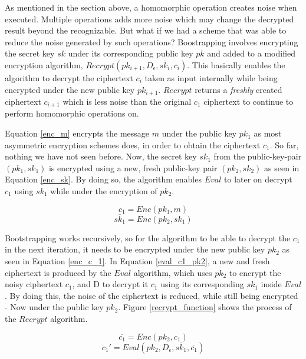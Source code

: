 As mentioned in the section above, a homomorphic operation creates noise when executed. Multiple operations adds more noise which may change the decrypted result beyond the recognizable. But what if we had a scheme that was able to reduce the noise generated by such operations? Boostrapping involves encrypting the secret key $sk$ under its corresponding public key $pk$ and added to a modified encryption algorithm, $Recrypt(pk_{i+1}, D_{\epsilon}, \overline{sk_i}, c_i)$. This basically enables the algorithm to decrypt the ciphertext $c_i$ taken as input internally while being encrypted under the new public key $pk_{i+1}$. $Recrypt$ returns a \emph{freshly} created ciphertext $c_{i+1}$ which is less noise than the original $c_1$ ciphertext to continue to perform homomorphic operations on.

Equation \ref{enc_m} encrypts the message $m$ under the public key $pk_1$ as most asymmetric encryption schemes does, in order to obtain the ciphertext $c_1$. So far, nothing we have not seen before. Now, the secret key $sk_1$ from the public-key-pair $(pk_1,sk_1)$ is encrypted using a new, fresh public-key pair $(pk_2, sk_2)$ as seen in Equation \ref{enc_sk}. By doing so, the algorithm enables $Eval$ to later on decrypt $c_1$ using $sk_1$ while under the encryption of $pk_2$.

\begin{equation}
\label{enc_m}
c_1 = Enc(pk_1, m)
\end{equation}
\begin{equation}
\label{enc_sk}
\overline{sk_1} = Enc(pk_2, sk_1)
\end{equation}


Bootstrapping works recursively, so for the algorithm to be able to decrypt the $c_1$ in the next iteration, it needs to be encrypted under the new public key $pk_2$ as seen in Equation \ref{enc_c_1}. In Equation \ref{eval_c1_pk2}, a new and fresh ciphertext is produced by the $Eval$ algorithm, which uses $pk_2$ to encrypt the noisy ciphertext $c_1$, and D to decrypt it $c_1$ using its corresponding $sk_1$ inside $Eval$. By doing this, the noise of the ciphertext is reduced, while still being encrypted - Now under the public key $pk_2$. Figure \ref{recrypt_function} shows the process of the $Recrypt$ algorithm.



\begin{equation}
\label{enc_c_1}
\overline{c_1} = Enc(pk_2, c_1)
\end{equation}
\begin{equation}
\label{eval_c1_pk2}
c_1' = Eval(pk_2, D_{\epsilon}, \overline{sk_1}, \overline{c_1})
\end{equation}



